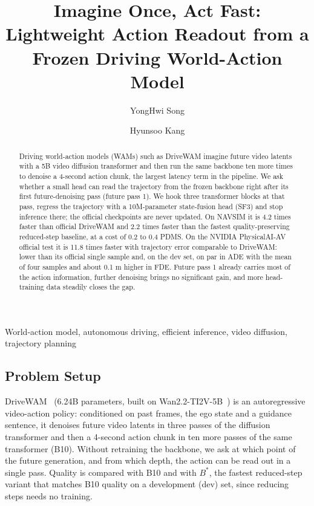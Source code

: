 \documentclass[nouppercase]{kaia}
\title{Imagine Once, Act Fast: Lightweight Action Readout from a Frozen Driving World-Action Model}
\author{YongHwi Song}{a}
\author{Hyunsoo Kang}{a}
\affiliation{School of Information and Communication Engineering, Chungbuk National University, Cheongju, Republic of Korea, \{thddydgnl1937@gmail.com, hskang@chungbuk.ac.kr\}}{a}
\begin{document}
\maketitle
\vspace{-28pt}

\begin{mdframed}

\begin{abstract}
Driving world-action models (WAMs) such as DriveWAM imagine future video latents with a 5B video diffusion transformer and then run the same backbone ten more times to denoise a 4-second action chunk, the largest latency term in the pipeline. We ask whether a small head can read the trajectory from the frozen backbone right after its first future-denoising pass (future pass 1). We hook three transformer blocks at that pass, regress the trajectory with a 10M-parameter state-fusion head (SF3) and stop inference there; the official checkpoints are never updated. On NAVSIM it is 4.2 times faster than official DriveWAM and 2.2 times faster than the fastest quality-preserving reduced-step baseline, at a cost of 0.2 to 0.4 PDMS. On the NVIDIA PhysicalAI-AV official test it is 11.8 times faster with trajectory error comparable to DriveWAM: lower than its official single sample and, on the dev set, on par in ADE with the mean of four samples and about 0.1 m higher in FDE. Future pass 1 already carries most of the action information, further denoising brings no significant gain, and more head-training data steadily closes the gap.
\end{abstract}
\begin{keywords}
World-action model, autonomous driving, efficient inference, video diffusion, trajectory planning
\end{keywords}

\subsection{Problem Setup}
DriveWAM~\cite{shi2026drivewam} (6.24B parameters, built on Wan2.2-TI2V-5B~\cite{wan2025wan}) is an autoregressive video-action policy: conditioned on past frames, the ego state and a guidance sentence, it denoises future video latents in three passes of the diffusion transformer and then a 4-second action chunk in ten more passes of the same transformer (B10). Without retraining the backbone, we ask at which point of the future generation, and from which depth, the action can be read out in a single pass. Quality is compared with B10 and with $B^{*}$, the fastest reduced-step variant that matches B10 quality on a development (dev) set, since reducing steps needs no training.


\end{mdframed}
\end{document}
